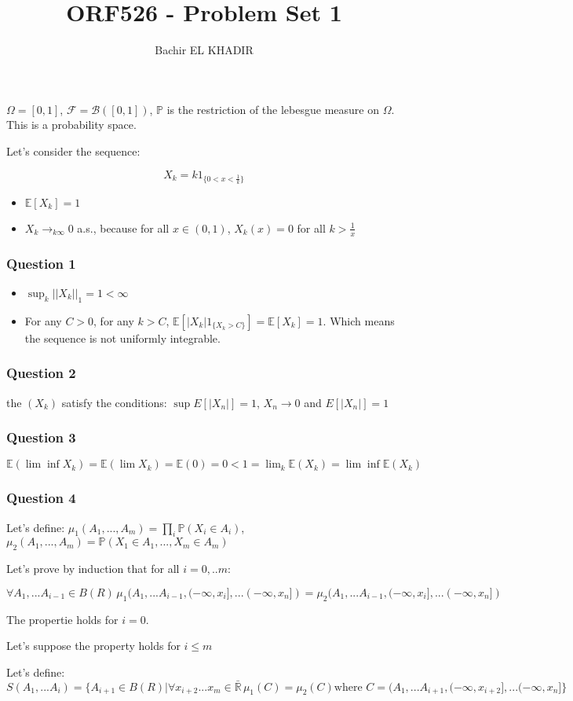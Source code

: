 \documentclass[12pt]{article}
\title{ORF526 - Problem Set 1}
\author{Bachir EL KHADIR }
\newcommand{\Q}[1]{\subsubsection*{Question #1}}
\begin{document}
\maketitle



$\Omega = [0, 1]$, $\mathcal F = \mathcal B([0, 1])$, $\mathbb{P}$ is the restriction of the lebesgue measure on $\Omega$. This is a probability space.


Let's consider the sequence:

$$X_k = k 1_{\{0 < x < \frac 1 k\}}$$


\begin{itemize}
\item $\mathbb{E}[X_k] = 1$
\item $X_k \rightarrow_{k \infty} 0$ a.s., because for all $x \in (0,1)$, $X_k(x) = 0$ for all $k > \frac{1}{x}$
\end{itemize}

\Q{1} 

\begin{itemize}
\item $\sup_k ||X_k||_1 = 1 < \infty$
\item For any $C > 0$, for any $k > C$, $\mathbb{E}[|X_k| 1_{\{X_k > C\}}] = \mathbb{E}[X_k] = 1$. Which means the sequence is not uniformly integrable.
\end{itemize}

\Q{2}
the $(X_k)$ satisfy the conditions: $\sup E[|X_n|] = 1$, $X_n \rightarrow 0$ and $E[|X_n|] = 1$

\Q{3}
$\mathbb{E}(\lim \inf X_k) = \mathbb{E}(\lim X_k) = \mathbb{E}(0) = 0 < 1 = \lim_k \mathbb{E}(X_k) = \lim \inf \mathbb{E}(X_k)$


\Q{4}

Let's define:
$\mu_1(A_1, ..., A_m) = \prod_i \mathbb{P}(X_i \in A_i)$,
$\mu_2(A_1, ..., A_m) = \mathbb{P}(X_1 \in A_1,...,X_m \in A_m)$

Let's prove by induction that for all $i = 0, .. m$:

$$\forall A_1, ... A_{i-1} \in B(R) \, \mu_1(A_1, ... A_{i-1}, (-\infty, x_i], ... (-\infty, x_n]) = \mu_2(A_1, ... A_{i-1}, (-\infty, x_i], ... (-\infty, x_n])$$

The propertie holds for $i=0$.

Let's suppose the property holds for $i \leq m$

Let's define: $$S(A_1, ... A_i) = \{ A_{i+1} \in B(R) | \forall x_{i+2} ... x_m\in \mathbb{\bar R} \, \mu_1(C) = \mu_2(C) \text{where } C = (A_1, ... A_{i+1}, (-\infty, x_{i+2}], ... (-\infty, x_n]\}$$
\end{document}
